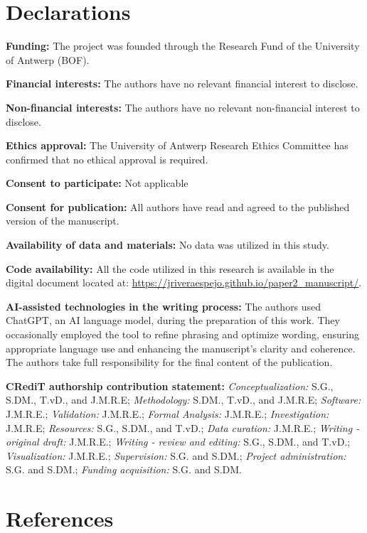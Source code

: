 \documentclass[
  authoryear,
  preprint,
  1p]{elsarticle}
\begin{document}
\newpage{}

\section*{Declarations}\label{declarations}

\textbf{Funding:} The project was founded through the Research Fund of
the University of Antwerp (BOF).

\textbf{Financial interests:} The authors have no relevant financial
interest to disclose.

\textbf{Non-financial interests:} The authors have no relevant
non-financial interest to disclose.

\textbf{Ethics approval:} The University of Antwerp Research Ethics
Committee has confirmed that no ethical approval is required.

\textbf{Consent to participate:} Not applicable

\textbf{Consent for publication:} All authors have read and agreed to
the published version of the manuscript.

\textbf{Availability of data and materials:} No data was utilized in
this study.

\textbf{Code availability:} All the code utilized in this research is
available in the digital document located at:
\url{https://jriveraespejo.github.io/paper2_manuscript/}.

\textbf{AI-assisted technologies in the writing process:} The authors
used ChatGPT, an AI language model, during the preparation of this work.
They occasionally employed the tool to refine phrasing and optimize
wording, ensuring appropriate language use and enhancing the
manuscript's clarity and coherence. The authors take full responsibility
for the final content of the publication.

\textbf{CRediT authorship contribution statement:}
\emph{Conceptualization:} S.G., S.DM., T.vD., and J.M.R.E;
\emph{Methodology:} S.DM., T.vD., and J.M.R.E; \emph{Software:}
J.M.R.E.; \emph{Validation:} J.M.R.E.; \emph{Formal Analysis:} J.M.R.E.;
\emph{Investigation:} J.M.R.E; \emph{Resources:} S.G., S.DM., and T.vD.;
\emph{Data curation:} J.M.R.E.; \emph{Writing - original draft:}
J.M.R.E.; \emph{Writing - review and editing:} S.G., S.DM., and T.vD.;
\emph{Visualization:} J.M.R.E.; \emph{Supervision:} S.G. and S.DM.;
\emph{Project administration:} S.G. and S.DM.; \emph{Funding
acquisition:} S.G. and S.DM.

\newpage{}

\section*{References}\label{references}

\renewcommand{\bibsection}{}

\end{document}
